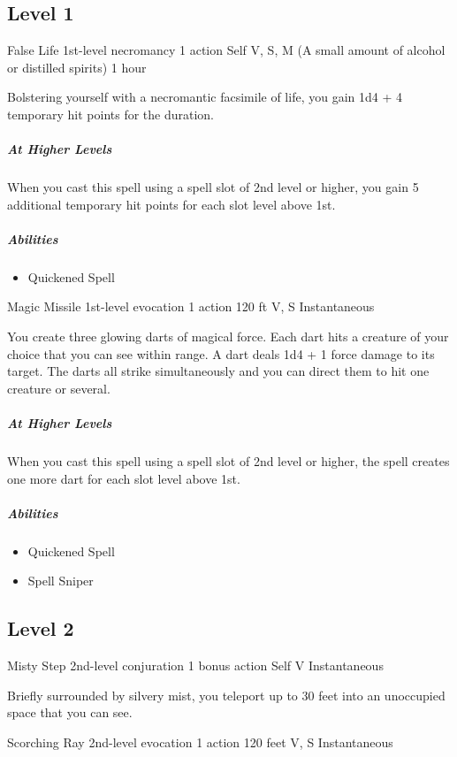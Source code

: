 \documentclass[a4paper,openany,twocolumn]{book}
\begin{document}
\subsection*{Level 1}

\DndSpellHeader
  {False Life}
  {1st-level necromancy}
  {1 action}
  {Self}
  {V, S, M (A small amount of alcohol or distilled spirits)}
  {1 hour}

Bolstering yourself with a necromantic facsimile of life, you gain 1d4 + 4 temporary hit points for the duration.
    
\subparagraph*{At Higher Levels} When you cast this spell using a spell slot of 2nd level or higher, you gain 5 additional temporary hit points for each slot level above 1st.

\subparagraph*{Abilities}
\begin{itemize}
  \item Quickened Spell
\end{itemize}

\DndSpellHeader
  {Magic Missile}
  {1st-level evocation}
  {1 action}
  {120 ft}
  {V, S}
  {Instantaneous}

You create three glowing darts of magical force. Each dart hits a creature of your choice that you can see within range. A dart deals 1d4 + 1 force damage to its target. The darts all strike simultaneously and you can direct them to hit one creature or several.

\subparagraph{At Higher Levels} When you cast this spell using a spell slot of 2nd level or higher, the spell creates one more dart for each slot level above 1st.

\subparagraph*{Abilities}
\begin{itemize} 
  \item Quickened Spell
  \item Spell Sniper
\end{itemize}

\subsection*{Level 2}

\DndSpellHeader
  {Misty Step}
  {2nd-level conjuration}
  {1 bonus action}
  {Self}
  {V}
  {Instantaneous}

Briefly surrounded by silvery mist, you teleport up to 30 feet into an unoccupied space that you can see.

\DndSpellHeader
  {Scorching Ray}
  {2nd-level evocation}
  {1 action}
  {120 feet}
  {V, S}
  {Instantaneous}
\end{document}
